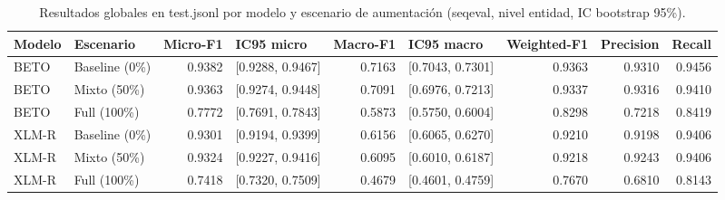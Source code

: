 \begin{table}
\caption{Resultados globales en test.jsonl por modelo y escenario de aumentación (seqeval, nivel entidad, IC bootstrap 95\%).}
\label{tab:resultados_ner}
\begin{tabular}{llrlrlrrr}
\toprule
Modelo & Escenario & Micro-F1 & IC95 micro & Macro-F1 & IC95 macro & Weighted-F1 & Precision & Recall \\
\midrule
BETO & Baseline (0\%) & 0.9382 & [0.9288, 0.9467] & 0.7163 & [0.7043, 0.7301] & 0.9363 & 0.9310 & 0.9456 \\
BETO & Mixto (50\%) & 0.9363 & [0.9274, 0.9448] & 0.7091 & [0.6976, 0.7213] & 0.9337 & 0.9316 & 0.9410 \\
BETO & Full (100\%) & 0.7772 & [0.7691, 0.7843] & 0.5873 & [0.5750, 0.6004] & 0.8298 & 0.7218 & 0.8419 \\
XLM-R & Baseline (0\%) & 0.9301 & [0.9194, 0.9399] & 0.6156 & [0.6065, 0.6270] & 0.9210 & 0.9198 & 0.9406 \\
XLM-R & Mixto (50\%) & 0.9324 & [0.9227, 0.9416] & 0.6095 & [0.6010, 0.6187] & 0.9218 & 0.9243 & 0.9406 \\
XLM-R & Full (100\%) & 0.7418 & [0.7320, 0.7509] & 0.4679 & [0.4601, 0.4759] & 0.7670 & 0.6810 & 0.8143 \\
\bottomrule
\end{tabular}
\end{table}
